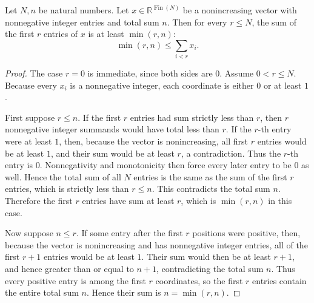 \begin{helper}
Let \(N,n\) be natural numbers.  Let
\(x\in\mathbb R^{\operatorname{Fin}(N)}\) be a nonincreasing vector with
nonnegative integer entries and total sum \(n\).  Then for every
\(r\le N\), the sum of the first \(r\) entries of \(x\) is at least
\(\min(r,n)\):
\[
\min(r,n)\le \sum_{i<r}x_i .
\]
\end{helper}
\begin{proof}
The case \(r=0\) is immediate, since both sides are \(0\).  Assume
\(0<r\le N\).  Because every \(x_i\) is a nonnegative integer, each
coordinate is either \(0\) or at least \(1\).

First suppose \(r\le n\).  If the first \(r\) entries had sum strictly less
than \(r\), then \(r\) nonnegative integer summands would have total less
than \(r\).  If the \(r\)-th entry were at least \(1\), then, because the
vector is nonincreasing, all first \(r\) entries would be at least \(1\), and
their sum would be at least \(r\), a contradiction.  Thus the \(r\)-th entry
is \(0\).  Nonnegativity and monotonicity then force every later entry to be
\(0\) as well.  Hence the total sum of all \(N\) entries is the same as the
sum of the first \(r\) entries, which is strictly less than \(r\le n\).  This
contradicts the total sum \(n\).  Therefore the first \(r\) entries have sum
at least \(r\), which is \(\min(r,n)\) in this case.

Now suppose \(n\le r\).  If some entry after the first \(r\) positions were
positive, then, because the vector is nonincreasing and has nonnegative
integer entries, all of the first \(r+1\) entries would be at least \(1\).
Their sum would then be at least \(r+1\), and hence greater than or equal to
\(n+1\), contradicting the total sum \(n\).  Thus every positive entry is
among the first \(r\) coordinates, so the first \(r\) entries contain the
entire total sum \(n\).  Hence their sum is \(n=\min(r,n)\).
\end{proof}
